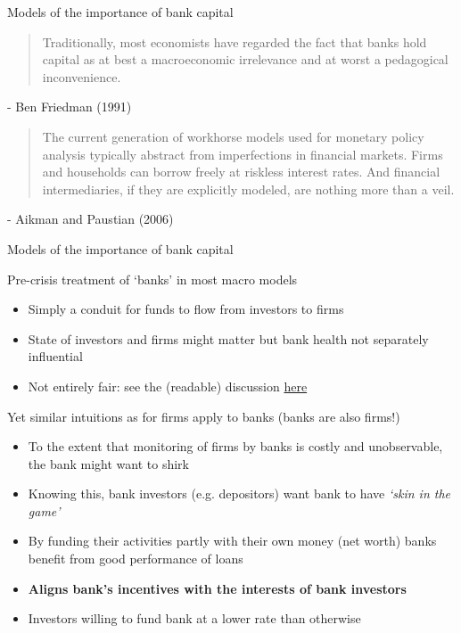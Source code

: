 

\begin{frame}{Models of the importance of bank capital}

\begin{quote}
Traditionally, most economists have regarded the fact that banks hold capital as at best a
macroeconomic irrelevance and at worst a pedagogical inconvenience.
\end{quote}
\begin{center}
- Ben Friedman (1991)
\end{center}

\begin{quote}
The current generation of workhorse models used for monetary policy analysis typically abstract
from imperfections in financial markets. Firms and households can borrow freely at riskless
interest rates. And financial intermediaries, if they are explicitly modeled, are nothing more than
a veil.
\end{quote}
\begin{center}
- Aikman and Paustian (2006)
\end{center}

\end{frame}



\begin{frame}{Models of the importance of bank capital}

Pre-crisis treatment of `banks' in most macro models
	\begin{itemize}
	\item	Simply a conduit for funds to flow from investors to firms
	\item	State of investors and firms might matter but bank health not separately influential
	\item	Not entirely fair: see the (readable) discussion \href{https://www.jstor.org/stable/2138389}{here}
	\end{itemize}
\vspace{2mm}
Yet similar intuitions as for firms apply to banks (banks are also firms!)
	\begin{itemize}
	\item	To the extent that monitoring of firms by banks is costly and unobservable, the bank might want to shirk
	\item	Knowing this, bank investors (e.g. depositors) want bank to have \textit{`skin in the game'}
	\item	By funding their activities partly with their own money (net worth) banks benefit from good performance of loans
	\item	\textbf{Aligns bank's incentives with the interests of bank investors}
	\item	Investors willing to fund bank at a lower rate than otherwise
	\end{itemize}

\end{frame}

